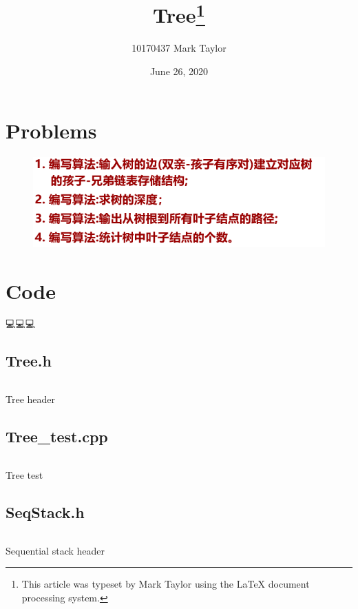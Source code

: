 \documentclass{article}
\begin{document}
	
	
	\title{Tree\footnote{
			This article was typeset by Mark Taylor using 
	the \protect\LaTeX{}
			document processing system. }}
	
	\author{10170437 Mark Taylor}
	
	\date{June 26, 2020}
	
	\maketitle
		
	\hypertarget{Contents}{}  %
	\tableofcontents
	
	
	\section{Problems}
	\begin{figure}[!hb]
		\centering
		\includegraphics[width=0.7\linewidth]{img/problems}
		\caption*{}
		\label{fig:problem}
	\end{figure}
	
	\section{Code}
	💻💻💻
	\subsection{Tree.h}		
	\begin{longlisting}
		\inputminted{c++}{src/Tree.h}
		\caption{Tree header}
		\label{Tree.h}
	\end{longlisting}
	
	\subsection{Tree\_test.cpp}	
	\begin{longlisting}
		\inputminted{c++}{src/Tree_test.cpp}
		\caption{Tree test}
		\label{Tree_test.cpp}
	\end{longlisting}

	\subsection{SeqStack.h}	
	\begin{longlisting}
		\inputminted{c++}{src/SeqStack.h}
		\caption{Sequential stack header}
		\label{SeqStack.h}
	\end{longlisting}
\end{document}
